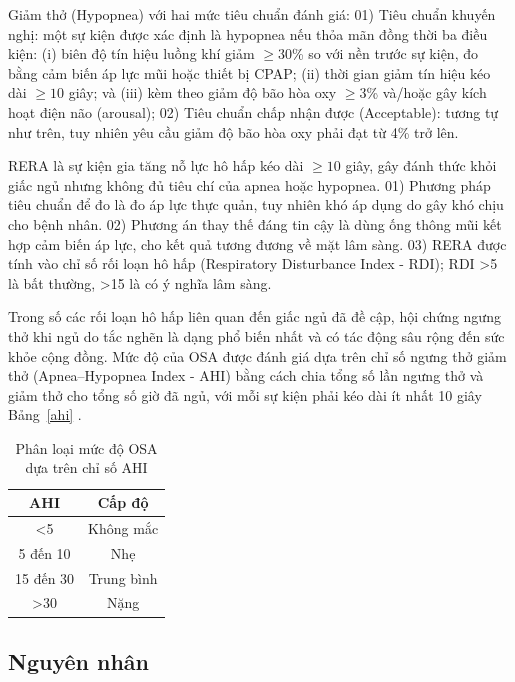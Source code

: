 Giảm thở (Hypopnea) với hai mức tiêu chuẩn đánh giá: 01) Tiêu chuẩn khuyến
nghị: một sự kiện được xác định là hypopnea nếu thỏa mãn đồng thời ba điều
kiện: (i) biên độ tín hiệu luồng khí giảm $\geq 30$\% so với nền trước sự kiện,
đo bằng cảm biến áp lực mũi hoặc thiết bị CPAP; (ii) thời gian giảm tín hiệu
kéo dài $\geq 10$ giây; và (iii) kèm theo giảm độ bão hòa oxy $\geq 3$\%
và/hoặc gây kích hoạt điện não (arousal); 02) Tiêu chuẩn chấp nhận được
(Acceptable): tương tự như trên, tuy nhiên yêu cầu giảm độ bão hòa oxy phải đạt
từ 4\% trở lên.

RERA là sự kiện gia tăng nỗ lực hô hấp kéo dài $\geq 10$ giây, gây đánh thức
khỏi giấc ngủ nhưng không đủ tiêu chí của apnea hoặc hypopnea. 01) Phương pháp
tiêu chuẩn để đo là đo áp lực thực quản, tuy nhiên khó áp dụng do gây khó chịu
cho bệnh nhân. 02) Phương án thay thế đáng tin cậy là dùng ống thông mũi kết
hợp cảm biến áp lực, cho kết quả tương đương về mặt lâm sàng. 03) RERA được
tính vào chỉ số rối loạn hô hấp (Respiratory Disturbance Index - RDI); RDI >5
là bất thường, >15 là có ý nghĩa lâm sàng.

Trong số các rối loạn hô hấp liên quan đến giấc ngủ đã đề cập, hội chứng ngưng
thở khi ngủ do tắc nghẽn là dạng phổ biến nhất và có tác động sâu rộng đến sức
khỏe cộng đồng. Mức độ của OSA được đánh giá dựa trên chỉ số ngưng thở giảm thở
(Apnea–Hypopnea Index - AHI) bằng cách chia tổng số lần ngưng thở và giảm thở
cho tổng số giờ đã ngủ, với mỗi sự kiện phải kéo dài ít nhất 10 giây
Bảng~\ref{ahi} \cite{osa_summary}.
\begin{table}[h!]
  \caption{\texorpdfstring{Phân loại mức độ OSA dựa trên chỉ số AHI}{Phân loại OSA}}
  \label{ahi}
  \vspace{-3mm}
  \begin{center}
    \begin{tabular}{|c|c|}
      \hline
      AHI       & Cấp độ     \\
      \hline
      <5        & Không mắc  \\
      5 đến 10  & Nhẹ        \\
      15 đến 30 & Trung bình \\
      >30       & Nặng       \\
      \hline
    \end{tabular}
    \label{tab1}
  \end{center}
\end{table}

\subsection{Nguyên nhân}

